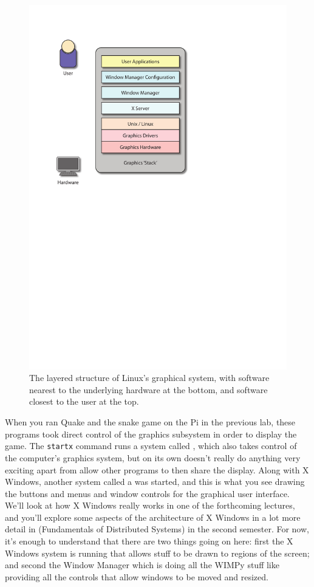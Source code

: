 \begin{figure}[htb]
  \begin{center}
    \includegraphics[width=.5\textwidth]{images/graphics-stack.pdf}
  \end{center}
\caption{The layered structure of Linux's graphical system, with software nearest to the underlying hardware at the bottom, and software closest to the user at the top.}
\label{figure:Xstructure}
\end{figure}

When you ran Quake and the snake game on the Pi in the previous lab, these programs took direct control of the graphics subsystem in order to display the game. The \texttt{startx} command runs a system called , which also takes control of the computer's graphics system, but on its own doesn't really do anything very exciting apart from allow other programs to then share the display. Along with X Windows, another system called a  was started, and this is what you see drawing the buttons and menus and window controls for the graphical user interface. We'll look at how X Windows really works in one of the forthcoming  lectures, and you'll explore some aspects of the architecture of X Windows in a lot more detail in  (Fundamentals of Distributed Systems) in the second semester. For now, it's enough to understand that there are two things going on here: first the X Windows system is running that allows stuff to be drawn to regions of the screen; and second the Window Manager which is doing all the WIMPy stuff like providing all the controls that allow windows to be moved and resized.

